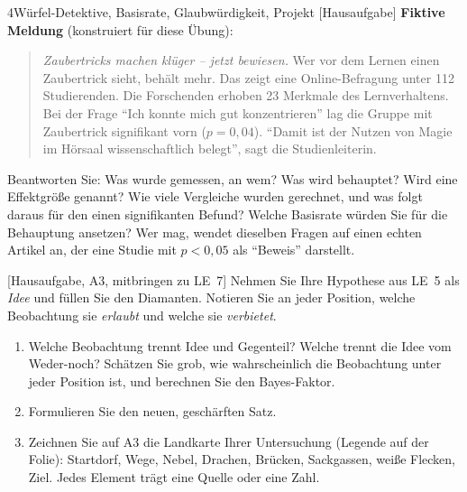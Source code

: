 \begin{uebungsblattb}{4}{Würfel-Detektive, Basisrate, Glaubwürdigkeit, Projekt}
[Hausaufgabe]
\textbf{Fiktive Meldung} (konstruiert für diese Übung):

\begin{quote}\small
\emph{Zaubertricks machen klüger -- jetzt bewiesen.} Wer vor dem Lernen
einen Zaubertrick sieht, behält mehr. Das zeigt eine Online-Befragung
unter 112 Studierenden. Die Forschenden erhoben 23 Merkmale des
Lernverhaltens. Bei der Frage \enquote{Ich konnte mich gut
konzentrieren} lag die Gruppe mit Zaubertrick signifikant vorn ($p =
0{,}04$). \enquote{Damit ist der Nutzen von Magie im Hörsaal
wissenschaftlich belegt}, sagt die Studienleiterin.
\end{quote}
Beantworten Sie: Was wurde gemessen, an wem? Was wird behauptet? Wird
eine Effektgröße genannt? Wie viele Vergleiche wurden gerechnet, und was
folgt daraus für den einen signifikanten Befund? Welche Basisrate würden
Sie für die Behauptung ansetzen? Wer mag, wendet dieselben Fragen auf
einen echten Artikel an, der eine Studie mit $p<0{,}05$ als
\enquote{Beweis} darstellt.

[Hausaufgabe, A3, mitbringen zu LE~7]
Nehmen Sie Ihre Hypothese aus LE~5 als \emph{Idee} und füllen Sie den
Diamanten. Notieren Sie an jeder Position, welche Beobachtung sie
\emph{erlaubt} und welche sie \emph{verbietet}.

\begin{center}
\end{center}
\begin{enumerate}
  \item Welche Beobachtung trennt Idee und Gegenteil? Welche trennt die
    Idee vom Weder-noch? Schätzen Sie grob, wie wahrscheinlich die
    Beobachtung unter jeder Position ist, und berechnen Sie den
    Bayes-Faktor.
  \item Formulieren Sie den neuen, geschärften Satz.
  \item Zeichnen Sie auf A3 die Landkarte Ihrer Untersuchung
    (Legende auf der Folie): Startdorf, Wege, Nebel, Drachen, Brücken,
    Sackgassen, weiße Flecken, Ziel. Jedes Element trägt eine Quelle oder
    eine Zahl.
\end{enumerate}


\end{uebungsblattb}

